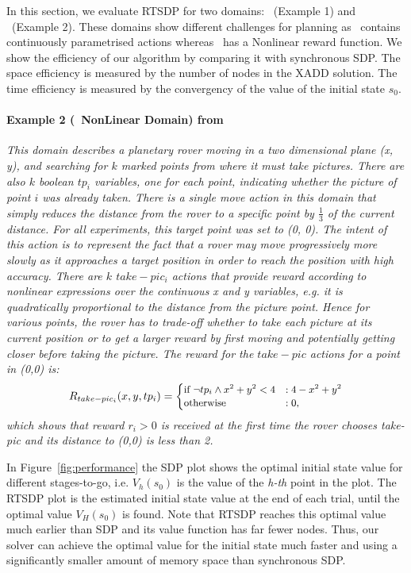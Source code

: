 In this section, we evaluate RTSDP for two domains: \Invent~(Example 1) and \Mars~(Example 2). These domains show different challenges for planning as \Invent~contains continuously parametrised actions whereas \Mars~has a Nonlinear reward function.
We show the efficiency of our algorithm by comparing it with synchronous SDP.
The space efficiency is measured by the number of nodes in the XADD solution.
The time efficiency is measured by the convergency of the value of the initial state $s_0$.

\vspace{1mm}
\paragraph{\bf Example 2 (\Mars~NonLinear Domain) from \cite{sanner11} \label{ex2}}
\textit{This domain describes a planetary rover moving in a two dimensional plane (x, y), and searching for $k$ marked points from where it must take pictures.
There are also $k$ boolean $tp_i$ variables, one for each point, indicating whether the picture of point $i$ was already taken.
There is a single move action in this domain that simply reduces the distance from the rover to a specific point by $\frac{1}{3}$ of the current distance.
For all experiments, this target point was set to (0, 0).
The intent of this action is to represent the fact that a rover may move progressively more
slowly as it approaches a target position in order to reach the position with high accuracy.
There are $k$ $take-pic_i$ actions that provide reward according to nonlinear expressions over the continuous x and y variables, e.g. it is quadratically proportional to the distance from the picture point.
Hence for various points, the rover has to trade-off whether to take each picture at its current position or to get a larger reward by first moving and potentially getting closer before taking the picture. The reward for the $take-pic$ actions for a point in (0,0) is:
\begin{align*}
\small
R_{take-pic_i} (x, y, tp_i) =
\begin{cases}
  \text{if }  \neg tp_i \wedge x^2 + y^2 < 4 &: 4 - x^2 + y^2\\ 
  \text{otherwise} &:0,
\end{cases}
\end{align*} 
which shows that reward $r_i > 0$ is received at the first time the rover chooses take-pic and its distance to (0,0) is less than 2.
}

In Figure~\ref{fig:performance} the SDP plot shows the optimal initial state value for different stages-to-go, i.e. $V_h(s_0)$ is the value of the {\it h-th} point in the plot. 
The RTSDP plot is the estimated initial state value at the end of each trial, until the optimal value $V_H(s_0)$ is found.
Note that RTSDP reaches this optimal value much earlier than SDP and its value function has far fewer nodes.
Thus, our solver can achieve the optimal value for the initial state much faster and using a significantly smaller amount of memory space than synchronous SDP.

